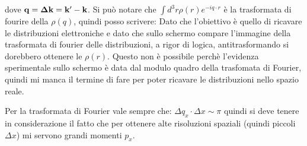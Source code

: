 \documentclass[a4paper,12pt]{article}
\begin{document}
dove $\it\bf{q} = \Delta \it\bf{k} = \it\bf{k'} - \it\bf{k}$. Si può notare che $\int d^3r \rho(r) e^{-i q\cdot r}$ è la trasformata di fourire della $\rho(q)$, quindi posso scrivere:
Dato che l'obiettivo è quello di ricavare le distribuzioni elettroniche e dato che sullo schermo compare l'immagine della trasformata di fourier delle distribuzioni, a rigor di logica, antitrasformando si dorebbero ottenere le $\rho(r)$. Questo non è possibile perchè l'evidenza sperimentale sullo schermo è data dal modulo quadro della trasfomata di Fourier, quindi mi manca il termine di fare per poter ricavare le distribuzioni nello spazio reale.

Per la trasformata di Fourier vale sempre che: $\Delta q_x \cdot \Delta x \sim \pi$ quindi si deve tenere in considerazione il fatto che per ottenere alte risoluzioni spaziali (quindi piccoli $\Delta x$) mi servono grandi momenti $p_x$.
\end{document}
